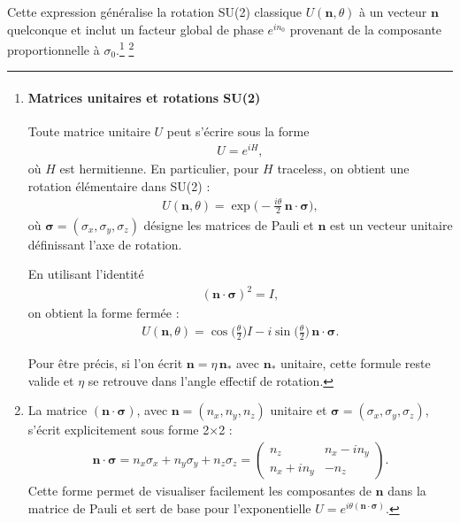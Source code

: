 Cette expression généralise la rotation SU(2) classique $U(\bm{n},\theta)$ à un vecteur $\bm{n}$ quelconque et inclut un facteur global de phase $e^{i n_0}$ provenant de la composante proportionnelle à $\sigma_0$.\footnote{

\paragraph*{Matrices unitaires et rotations SU(2)}

Toute matrice unitaire $U$ peut s'écrire sous la forme
\begin{eqnarray}
U = e^{i H},
\end{eqnarray}
où $H$ est hermitienne. En particulier, pour $H$ traceless, on obtient une rotation élémentaire dans SU(2) :
\begin{eqnarray}
U(\bm{n},\theta) = \exp\Big(-\frac{i \theta}{2} \, \bm{n} \cdot \bm{\sigma} \Big),
\end{eqnarray}
où \(\bm{\sigma} = (\sigma_x, \sigma_y, \sigma_z)\) désigne les matrices de Pauli et \(\bm{n}\) est un vecteur unitaire définissant l'axe de rotation.  

En utilisant l'identité
\begin{eqnarray}
(\bm{n} \cdot \bm{\sigma})^2 = I,
\end{eqnarray}
on obtient la forme fermée :
\begin{eqnarray}
U(\bm{n},\theta) = \cos\Big(\frac{\theta}{2}\Big) I - i \sin\Big(\frac{\theta}{2}\Big) \, \bm{n} \cdot \bm{\sigma}.
\end{eqnarray}

Pour être précis, si l'on écrit \(\bm{n} = \eta \, \bm{n}_\ast\) avec \(\bm{n}_\ast\) unitaire, cette formule reste valide et \(\eta\) se retrouve dans l'angle effectif de rotation.

}
\footnote{La matrice $(\bm{n} \cdot \bm{\sigma})$, avec $\bm{n} = (n_x, n_y, n_z)$ unitaire et $\bm{\sigma} = (\sigma_x, \sigma_y, \sigma_z)$, s'écrit explicitement sous forme 2×2 :
\begin{eqnarray}
\bm{n} \cdot \bm{\sigma} = n_x \sigma_x + n_y \sigma_y + n_z \sigma_z
= \begin{pmatrix}
n_z & n_x - i n_y \\
n_x + i n_y & -n_z
\end{pmatrix}.
\end{eqnarray}
Cette forme permet de visualiser facilement les composantes de $\bm{n}$ dans la matrice de Pauli et sert de base pour l'exponentielle $U = e^{i \theta (\bm{n} \cdot \bm{\sigma})}$.}
